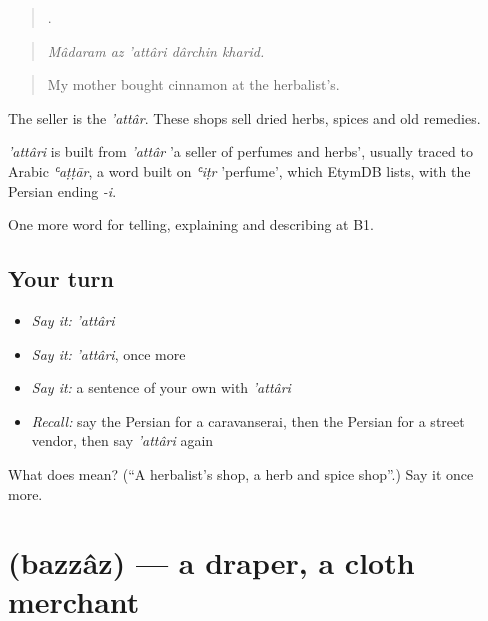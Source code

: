 \begin{quote}
    .
\end{quote}

\begin{quote}
\emph{Mâdaram az 'attâri dârchin kharid.}
\end{quote}

\begin{quote}
My mother bought cinnamon at the herbalist's.
\end{quote}

The seller is the \emph{'attâr}. These shops sell dried herbs, spices and old remedies.

\begin{cousinweb}
\emph{'attâri} is built from \emph{'attâr} 'a seller of perfumes and herbs', usually traced to Arabic \emph{ʿaṭṭār}, a word built on \emph{ʿiṭr} 'perfume', which EtymDB lists, with the Persian ending \emph{-i}.
\end{cousinweb}

\begin{grammarlens}[title={What you've built}]
One more word for telling, explaining and describing at B1.
\end{grammarlens}

\subsection*{Your turn}
\begin{itemize}
\raggedright
  \item \emph{Say it:} \emph{'attâri}
  \item \emph{Say it:} \emph{'attâri}, once more
  \item \emph{Say it:} a sentence of your own with \emph{'attâri}
  \item \emph{Recall:} say the Persian for a caravanserai, then the Persian for a street vendor, then say \emph{'attâri} again
\end{itemize}

\begin{tcolorbox}[breakable,colback=teal!4,colframe=teal!35!black,title={Before you move on}]
What does  mean? (\textquotedblleft{}A herbalist's shop, a herb and spice shop\textquotedblright{}.) Say it once more.
\end{tcolorbox}
\section[\texorpdfstring{\fa{بزاز} (bazzâz)}{بزاز (bazzâz)}]{ (bazzâz) — a draper, a cloth merchant}

